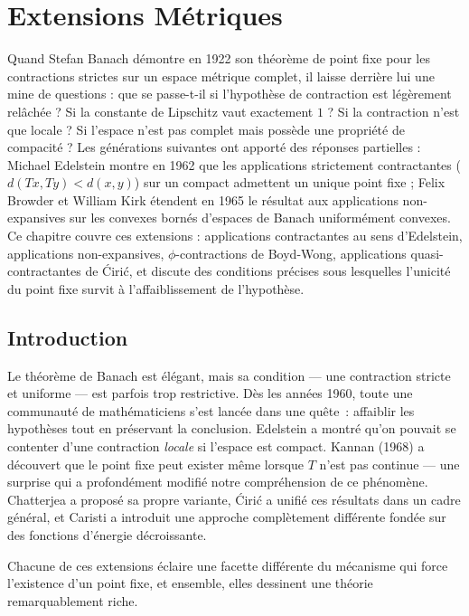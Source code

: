 \chapter{Extensions M\'etriques}\label{ch:extensions}

Quand Stefan Banach démontre en 1922 son théorème de point fixe pour les contractions strictes sur un espace métrique complet, il laisse derrière lui une mine de questions : que se passe-t-il si l'hypothèse de contraction est légèrement relâchée ? Si la constante de Lipschitz vaut exactement $1$ ? Si la contraction n'est que locale ? Si l'espace n'est pas complet mais possède une propriété de compacité ? Les générations suivantes ont apporté des réponses partielles : Michael Edelstein montre en 1962 que les applications strictement contractantes ($d(Tx,Ty) < d(x,y)$) sur un compact admettent un unique point fixe ; Felix Browder et William Kirk étendent en 1965 le résultat aux applications non-expansives sur les convexes bornés d'espaces de Banach uniformément convexes. Ce chapitre couvre ces extensions : applications contractantes au sens d'Edelstein, applications non-expansives, $\phi$-contractions de Boyd-Wong, applications quasi-contractantes de Ćirić, et discute des conditions précises sous lesquelles l'unicité du point fixe survit à l'affaiblissement de l'hypothèse.

\section{Introduction}

Le th\'eor\`eme de Banach est \'el\'egant, mais sa condition --- une contraction stricte et uniforme --- est parfois trop restrictive. D\`es les ann\'ees 1960, toute une communaut\'e de math\'ematiciens s'est lanc\'ee dans une qu\^ete~: affaiblir les hypoth\`eses tout en pr\'eservant la conclusion. Edelstein a montr\'e qu'on pouvait se contenter d'une contraction \emph{locale} si l'espace est compact. Kannan (1968) a d\'ecouvert que le point fixe peut exister m\^eme lorsque $T$ n'est pas continue --- une surprise qui a profond\'ement modifi\'e notre compr\'ehension de ce ph\'enom\`ene. Chatterjea a propos\'e sa propre variante, \'Ciri\'c a unifi\'e ces r\'esultats dans un cadre g\'en\'eral, et Caristi a introduit une approche compl\`etement diff\'erente fond\'ee sur des fonctions d'\'energie d\'ecroissante.

Chacune de ces extensions \'eclaire une facette diff\'erente du m\'ecanisme qui force l'existence d'un point fixe, et ensemble, elles dessinent une th\'eorie remarquablement riche.

